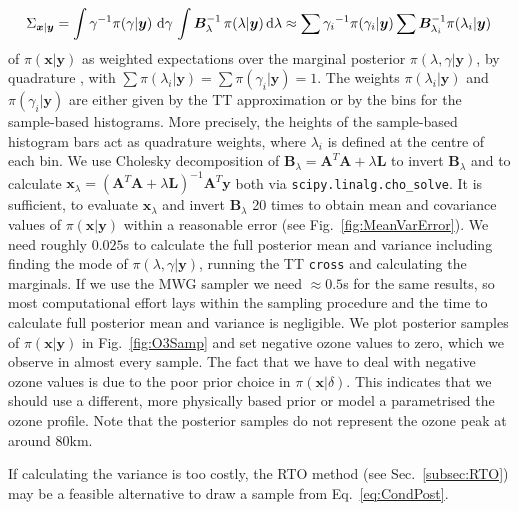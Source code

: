 \begin{align}
	\Sigma_{\bm{x}|\bm{y}} = \int \gamma^{-1}  \pi(\gamma | \bm{y} ) \, \mathop{}\!\mathrm{d} \gamma \, \int  \bm{B}_{\lambda}^{-1} \, \pi(\lambda | \bm{y} )  \, \text{d} \lambda  \approx \sum {\gamma_i}^{-1}\pi(\gamma_i| \bm{y}) \sum \bm{B}_{\lambda_i}^{-1}\pi(\lambda_i| \bm{y})\, \label{eq:CovInt}
\end{align}
of $\pi(\bm{x}| \bm{y})$ as weighted expectations over the marginal posterior $\pi(\lambda,\gamma | \bm{y})$, by quadrature \cite[Sec. 2.1]{Dick_Kuo_Sloan_2013}, with $\sum \pi(\lambda_i| \bm{y}) = \sum \pi(\gamma_i| \bm{y}) = 1$.
The weights $\pi(\lambda_i| \bm{y})$ and $\pi(\gamma_i| \bm{y})$ are either given by the TT approximation or by the bins for the sample-based histograms.
More precisely, the heights of the sample-based histogram bars act as quadrature weights, where $\lambda_i$ is defined at the centre of each bin.
We use Cholesky decomposition of $\bm{B}_{\lambda} = \bm{A}^T \bm{A} + \lambda \bm{L}$ to invert $\bm{B}_{\lambda}$ and to calculate $\bm{x}_{\lambda} = (\bm{A}^T \bm{A} + \lambda \bm{L} )^{-1} \bm{A}^T \bm{y}$ both via \texttt{scipy.linalg.cho\_solve}.
It is sufficient, to evaluate $\bm{x}_{\lambda}$ and invert $\bm{B}_{\lambda}$ 20 times to obtain mean and covariance values of $\pi(\bm{x}|\bm{y})$ within a reasonable error (see Fig.~\ref{fig:MeanVarError}).
We need roughly $0.025$s to calculate the full posterior mean and variance including finding the mode of $\pi(\lambda,\gamma|\bm{y})$, running the TT \texttt{cross} and calculating the marginals.
If we use the MWG sampler we need $\approx0.5$s for the same results, so most computational effort lays within the sampling procedure and the time to calculate full posterior mean and variance is negligible.
We plot posterior samples of $\pi(\bm{x}|\bm{y})$ in Fig.~\ref{fig:O3Samp} and set negative ozone values to zero, which we observe in almost every sample.
The fact that we have to deal with negative ozone values is due to the poor prior choice in $\pi(\bm{x}|\delta)$.
This indicates that we should use a different, more physically based prior or model a parametrised the ozone profile.
Note that the posterior samples do not represent the ozone peak at around $80$km.

If calculating the variance is too costly, the RTO method (see Sec.~\ref{subsec:RTO}) may be a feasible alternative to draw a sample from Eq.~\ref{eq:CondPost}.

